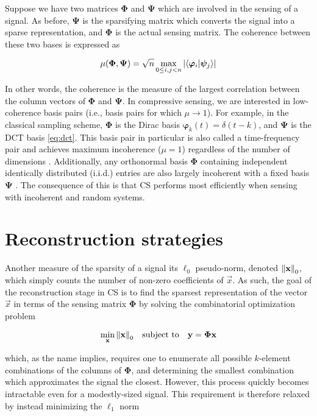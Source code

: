 Suppose we have two matrices $\bm\Phi$ and $\bm\Psi$ which are involved in the sensing of a signal. As before, $\bm\Psi$ is the sparsifying matrix which converts the signal into a sparse representation, and $\bm\Phi$ is the actual sensing matrix. The coherence between these two bases is expressed as

\begin{equation}\label{eq:coherence}
	\mu\qty(\bm\Phi, \bm\Psi) = \sqrt{n} \max_{0 \leq i,j < n} \abs{\innerproduct{\bm\varphi_i}{\bm\psi_j}}
\end{equation}

In other words, the coherence is the measure of the largest correlation between the column vectors of $\bm\Phi$ and $\bm\Psi$. In compressive sensing, we are interested in low-coherence basis pairs (i.e., basis pairs for which $\mu \rightarrow 1$). For example, in the classical sampling scheme, $\bm\Phi$ is the Dirac basis $\bm\varphi_k(t) = \delta(t - k)$, and $\bm\Psi$ is the DCT basis \eqref{eq:dct}. This basis pair in particular is also called a time-frequency pair and achieves maximum incoherence ($\mu = 1$) regardless of the number of dimensions \cite{Donoho2001}. Additionally, any orthonormal basis $\bm\Phi$ containing independent identically distributed (i.i.d.) entries are also largely incoherent with a fixed basis $\bm\Psi$ \cite{Candes2008b}. The consequence of this is that CS performs most efficiently when sensing with incoherent and random systems.


\section{Reconstruction strategies}
\label{sec:reconstruct}
Another measure of the sparsity of a signal its $\ell_0$ pseudo-norm, denoted $\norm{\text{\bfseries x}}_0$, which simply counts the number of non-zero coefficients of $\vec{x}$. As such, the goal of the reconstruction stage in CS is to find the sparsest representation of the vector $\vec{x}$ in terms of the sensing matrix $\bm\Phi$ by solving the combinatorial optimization problem

\begin{equation}\label{eq:min-l0}
	\min_{\text{\bfseries x}} \norm{\text{\bfseries x}}_0 \quad \textrm{subject to} \quad \text{\bfseries y} = \bm\Phi \text{\bfseries x}
\end{equation}

\noindent which, as the name implies, requires one to enumerate all possible $k$-element combinations of the columns of $\bm\Phi$, and determining the smallest combination which approximates the signal the closest. However, this process quickly becomes intractable even for a modestly-sized signal. This requirement is therefore relaxed by instead minimizing the $\ell_1$ norm

